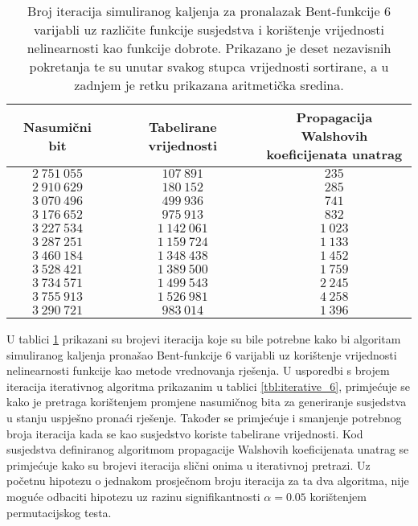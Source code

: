 \begin{table}[]
    \centering
    \captionsetup{justification=centering}
    \caption{Broj iteracija simuliranog kaljenja za pronalazak Bent-funkcije $6$ varijabli uz različite funkcije susjedstva i korištenje vrijednosti nelinearnosti kao funkcije dobrote. Prikazano je deset nezavisnih pokretanja te su unutar svakog stupca vrijednosti sortirane, a u zadnjem je retku prikazana aritmetička sredina.}
    \begin{tabular}{ccc} \hline
        Nasumični bit & Tabelirane vrijednosti & \makecell{Propagacija Walshovih \\ koeficijenata unatrag} \\ \hline
        $2\:751\:055$ &    $107\:891$ &    $235$ \\
        $2\:910\:629$ &    $180\:152$ &    $285$ \\
        $3\:070\:496$ &    $499\:936$ &    $741$ \\
        $3\:176\:652$ &    $975\:913$ &    $832$ \\
        $3\:227\:534$ & $1\:142\:061$ & $1\:023$ \\
        $3\:287\:251$ & $1\:159\:724$ & $1\:133$ \\
        $3\:460\:184$ & $1\:348\:438$ & $1\:452$ \\
        $3\:528\:421$ & $1\:389\:500$ & $1\:759$ \\
        $3\:734\:571$ & $1\:499\:543$ & $2\:245$ \\
        $3\:755\:913$ & $1\:526\:981$ & $4\:258$ \\ \hline
        $3\:290\:721$ &    $983\:014$ & $1\:396$
    \end{tabular}
    \label{tbl:simaneal_6_nonl}
\end{table}
U tablici \ref{tbl:simaneal_6_nonl} prikazani su brojevi iteracija koje su bile potrebne kako bi algoritam simuliranog kaljenja pronašao Bent-funkcije 6 varijabli uz korištenje vrijednosti nelinearnosti funkcije kao metode vrednovanja rješenja.
U usporedbi s brojem iteracija iterativnog algoritma prikazanim u tablici \ref{tbl:iterative_6}, primjećuje se kako je pretraga korištenjem promjene nasumičnog bita za generiranje susjedstva u stanju uspješno pronaći rješenje.
Također se primjećuje i smanjenje potrebnog broja iteracija kada se kao susjedstvo koriste tabelirane vrijednosti.
Kod susjedstva definiranog algoritmom propagacije Walshovih koeficijenata unatrag se primjećuje kako su brojevi iteracija slični onima u iterativnoj pretrazi.
Uz početnu hipotezu o jednakom prosječnom broju iteracija za ta dva algoritma, nije moguće odbaciti hipotezu uz razinu signifikantnosti $\alpha = 0.05$ korištenjem permutacijskog testa.

